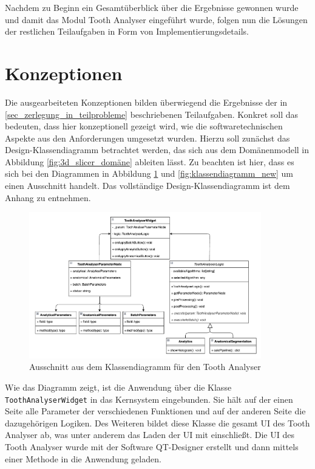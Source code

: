Nachdem zu Beginn ein Gesamtüberblick über die Ergebnisse gewonnen wurde und damit
das Modul Tooth Analyser eingeführt wurde, folgen nun die Lösungen der
restlichen Teilaufgaben in Form von Implementierungsdetails.

\pagebreak

\section{Konzeptionen}
\label{sec:konzeptionen} Die ausgearbeiteten Konzeptionen bilden überwiegend die
Ergebnisse der in \ref{sec_zerlegung_in_teilprobleme} beschriebenen Teilaufgaben.
Konkret soll das bedeuten, dass hier konzeptionell gezeigt wird, wie die
softwaretechnischen Aspekte aus den Anforderungen umgesetzt wurden. Hierzu soll zunächst
das Design-Klassendiagramm betrachtet werden, das sich aus dem Domänenmodell in
Abbildung \ref{fig:3d_slicer_domäne} ableiten lässt. Zu beachten ist hier, dass
es sich bei den Diagrammen in Abbildung \ref{fig:klassendiagramm} und
\ref{fig:klassendiagramm_new} um einen Ausschnitt handelt. Das vollständige Design-Klassendiagramm
ist dem Anhang zu entnehmen.

\begin{figure}[h]
	\centering
	\includegraphics[width=0.9\textwidth]{
		img/tooth_analyser_class_diagram_light.png
	}
	\caption{Ausschnitt aus dem Klassendiagramm für den Tooth Analyser}
	\label{fig:klassendiagramm}
\end{figure}

Wie das Diagramm zeigt, ist die Anwendung über die Klasse \texttt{ToothAnalyserWidget}
in das Kernsystem eingebunden. Sie hält auf der einen Seite alle Parameter der verschiedenen
Funktionen und auf der anderen Seite die dazugehörigen Logiken. Des Weiteren
bildet diese Klasse die gesamt \ac{UI} des Tooth Analyser ab, was unter anderem
das Laden der \ac{UI} mit einschließt. Die \ac{UI} des Tooth Analyser wurde mit der
Software QT-Designer erstellt und dann mittels einer Methode in die Anwendung geladen.

